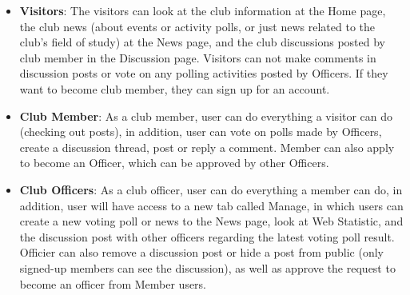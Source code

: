 \documentclass{article}
\begin{document}
\begin{itemize}
    \item \textbf{Visitors}: The visitors can look at the club information at the Home page, the club news (about events or activity polls, or just news related to the club's field of study) at the News page, and the club discussions posted by club member in the Discussion page. Visitors can not make comments in discussion posts or vote on any polling activities posted by Officers. If they want to become club member, they can sign up for an account.
    \item \textbf{Club Member}: As a club member, user can do everything a visitor can do (checking out posts), in addition, user can vote on polls made by Officers, create a discussion thread, post or reply a comment. Member can also apply to become an Officer, which can be approved by other Officers.
    \item \textbf{Club Officers}: As a club officer, user can do everything a member can do, in addition, user will have access to a new tab called Manage, in which users can create a new voting poll or news to the News page, look at Web Statistic, and the discussion post with other officers regarding the latest voting poll result. Officier can also remove a discussion post or hide a post from public (only signed-up members can see the discussion), as well as approve the request to become an officer from Member users.
\end{itemize}
\end{document}
